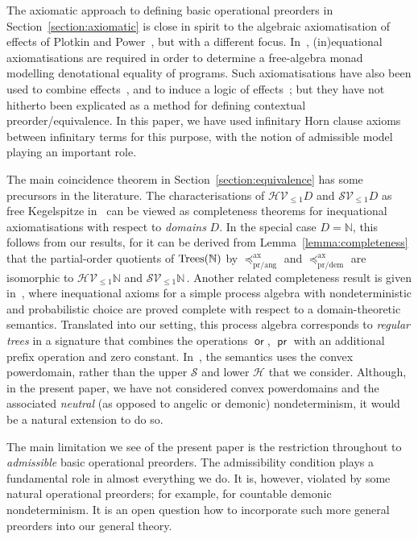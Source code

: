\documentclass[a4paper,UKenglish]{lipics-v2018}
\newcommand{\Tree}{\textnormal{Trees}} %
\newcommand{\Basicleq}{\preccurlyeq}
\newcommand{\prEff}{\operatorname{\textsf{pr}}}
\newcommand{\orEff}{\operatorname{\textsf{or}}}
\newcommand{\prang}{\text{pr/ang}}
\newcommand{\prdem}{\text{pr/dem}}
\newcommand{\Ax}{\text{ax}}
\theoremstyle{plain}
\begin{document}
The axiomatic approach to defining basic operational preorders in Section~\ref{section:axiomatic} is close in spirit to the algebraic axiomatisation of effects of Plotkin and Power~\cite{PlotkinPower2002}, but with a different focus. 
In~\cite{PlotkinPower2002}, (in)equational axiomatisations are required in order to determine a
free-algebra monad modelling denotational equality of programs. Such axiomatisations have also been used to combine effects~\cite{hyland2006combining},
 and to induce a logic of effects~\cite{PlotkinPretnarLogic}; but they have not 
 hitherto been explicated as a method for defining  contextual preorder/equivalence. 
 In this paper, we have used  infinitary Horn clause axioms between infinitary terms for this purpose, with the notion of admissible model playing an important role.
 
 The main coincidence theorem in Section~\ref{section:equivalence} has some precursors in the literature. 
 The characterisations of  $\mathcal{H}\mathcal{V}_{\leq 1} D$
 and  $\mathcal{S}\mathcal{V}_{\leq 1} D$ as free Kegelspitze in~\cite{KeimelP2016} can be viewed as completeness theorems for inequational axiomatisations with respect to
 \emph{domains} $D$. In the special case $D = \mathbb{N}$, this follows from our results, for it can be derived from Lemma~\ref{lemma:completeness} that the partial-order quotients of 
 $\Tree(\mathbb{N})$ by $\Basicleq^\Ax_\prang$ and $\Basicleq^\Ax_\prdem$ are isomorphic to
  $\mathcal{H}\mathcal{V}_{\leq 1} \mathbb{N}$
 and  $\mathcal{S}\mathcal{V}_{\leq 1} \mathbb{N}\,$.  Another related completeness result is given in~\cite{mislove2004axioms},  where inequational axioms for 
 a simple process algebra with nondeterministic and probabilistic choice are proved
 complete with respect to a domain-theoretic semantics. Translated into our setting, this process algebra corresponds to  \emph{regular trees} in a signature that combines
 the operations $\orEff$, $\prEff$ with an additional prefix operation and zero constant.
In~\cite{mislove2004axioms}, the semantics uses the convex powerdomain, rather than the upper $\mathcal{S}$ and lower $\mathcal{H}$ that we consider. Although, in  the present paper, we have 
not considered  convex powerdomains and the associated \emph{neutral} (as opposed to angelic or demonic) nondeterminism, it would be a natural extension to do so.

The main limitation we see of the present paper is the restriction throughout to \emph{admissible} basic operational preorders. The admissibility condition plays a fundamental role in almost everything we do. It is, however, violated by some natural operational preorders; for example,  for countable demonic nondeterminism. 
It is an open question how to incorporate such more general preorders into our general theory.
\end{document}

